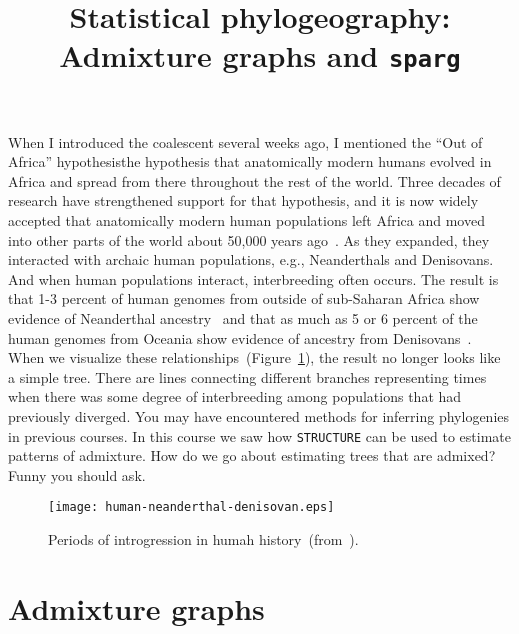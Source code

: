 \documentclass[12pt]{article}
\title{Statistical phylogeography: Admixture graphs and {\tt sparg}}
\begin{document}
\maketitle

\thispagestyle{first}

When I introduced the coalescent several weeks ago, I mentioned the
``Out of Africa'' hypothesis{\dash}the hypothesis that anatomically
modern humans evolved in Africa and spread from there throughout the
rest of the world. Three decades of research have strengthened support
for that hypothesis, and it is now widely accepted that anatomically
modern human populations left Africa and moved into other parts of the
world about 50,000 years ago~\cite{Karmin-etal-2015}. As they
expanded, they interacted with archaic human populations, e.g.,
Neanderthals and Denisovans. And when human populations interact,
interbreeding often occurs. The result is that 1-3 percent of human
genomes from outside of sub-Saharan Africa show evidence of
Neanderthal ancestry~\cite{Prufer-etal-2014} and that as much as 5 or
6 percent of the human genomes from Oceania show evidence of ancestry
from Denisovans~\cite{Meyer-etal-2012}. When we visualize these
relationships~(Figure~\ref{fig:human-neanderthal-denisovan}), the
result no longer looks like a simple tree. There are lines connecting
different branches representing times when there was some degree of
interbreeding among populations that had previously diverged. You may
have encountered methods for inferring phylogenies in previous
courses. In this course we saw how {\tt STRUCTURE} can be used to
estimate patterns of admixture. How do we go about estimating trees
that are admixed? Funny you should ask.

\begin{figure}
  \begin{center}
    \texttt{[image: human-neanderthal-denisovan.eps]}
  \end{center}
  \caption{Periods of introgression in humah
    history~(from~\cite{Ahlquist-etal-2021}).}\label{fig:human-neanderthal-denisovan}
\end{figure}

\section*{Admixture graphs}
\end{document}
